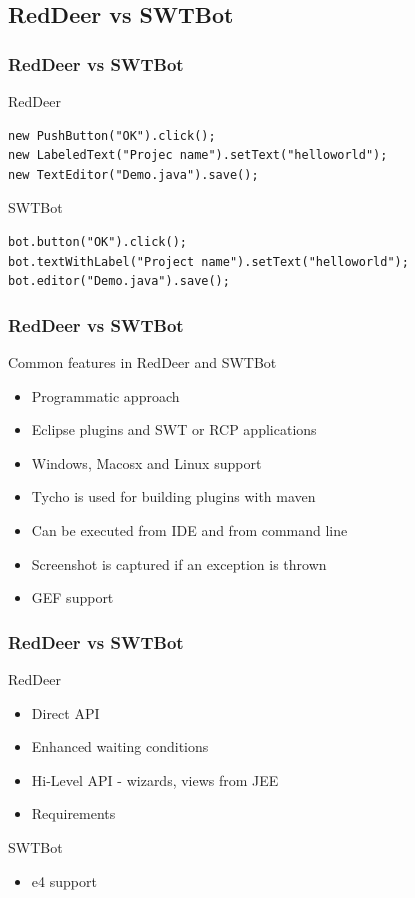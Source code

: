 \documentclass{beamer}
\begin{document}
\subsection{RedDeer vs SWTBot}
\begin{frame}[fragile]
\frametitle{RedDeer vs SWTBot}
RedDeer  
\begin{lstlisting}
new PushButton("OK").click();
new LabeledText("Projec name").setText("helloworld");
new TextEditor("Demo.java").save();
\end{lstlisting}
\vspace{0.5cm}
SWTBot
\begin{lstlisting}
bot.button("OK").click();
bot.textWithLabel("Project name").setText("helloworld");
bot.editor("Demo.java").save();
\end{lstlisting}
\end{frame}

\begin{frame}[fragile]
\frametitle{RedDeer vs SWTBot}
Common features in RedDeer and SWTBot
\begin{itemize}
\item Programmatic approach
\item Eclipse plugins and SWT or RCP applications
\item Windows, Macosx and Linux support
\item Tycho is used for building plugins with maven
\item Can be executed from IDE and from command line
\item Screenshot is captured if an exception is thrown
\item GEF support
\end{itemize}
\end{frame}

\begin{frame}[fragile]
\frametitle{RedDeer vs SWTBot}
RedDeer
\begin{itemize}
\item Direct API
\item Enhanced waiting conditions
\item Hi-Level API - wizards, views from JEE
\item Requirements
\end{itemize}
\vspace{0.5cm}
SWTBot
\begin{itemize}
\item e4 support
\end{itemize}
\end{frame}
\end{document}

